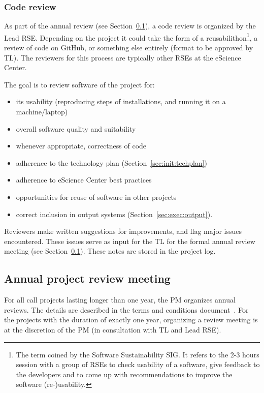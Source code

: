 \subsubsection{Code review}
As part of the annual review (see Section~\ref{sec:exec:annual}), a code review is organized by the Lead RSE. Depending
on the project it could take the form of a reusabilithon\footnote{The term coined by the Software Sustainability SIG.
It refers to the 2-3 hours session with a group of RSEs to check usability of a software, give feedback to the
developers and to come up with recommendations to improve the software (re-)usability.}, a review of code on GitHub, or
something else entirely (format to be approved by TL). The reviewers for this process are typically other RSEs at the
eScience Center.


The goal is to review software of the project for:
\begin{itemize}
\item its usability (reproducing steps of installations, and running it on a machine/laptop)
\item overall software quality and suitability
\item whenever appropriate, correctness of code
\item adherence to the technology plan (Section~\ref{sec:init:techplan})
\item adherence to eScience Center best practices
\item opportunities for reuse of software in other projects
\item correct inclusion in output systems (Section~\ref{sec:exec:output}).
\end{itemize}

Reviewers make written suggestions for improvements, and flag major issues encountered. These issues serve as input for
the TL for the formal annual review meeting (see Section~\ref{sec:exec:annual}). These notes are stored in the project log. 

\subsection{Annual project review meeting}
\label{sec:exec:annual}
For all call projects lasting longer than one year, the PM organizes annual reviews. The details are described in the
terms and conditions document~\cite{nlesc-terms}. For the projects with the
duration of exactly one year, organizing a review meeting is at the discretion of the PM (in consultation with TL and
Lead RSE). 

